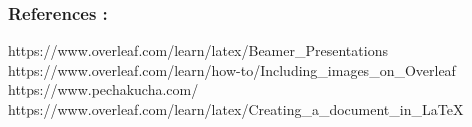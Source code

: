 \documentclass{beamer}
\begin{document}
\begin{frame}
\frametitle{ References : }
https://www.overleaf.com/learn/latex/Beamer_Presentations \newline
https://www.overleaf.com/learn/how-to/Including_images_on_Overleaf \newline
https://www.pechakucha.com/ \newline
https://www.overleaf.com/learn/latex/Creating_a_document_in_LaTeX




 
\end{frame}






 
 

 
\end{document}
